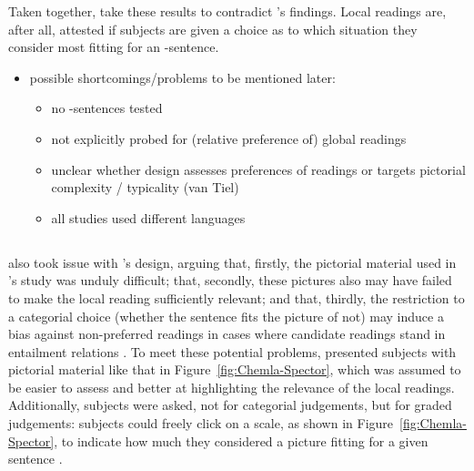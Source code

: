 \documentclass[fleqn,reqno,10pt,draft]{article}
\newcommand{\as}{\acro{as}}
\renewcommand{\es}{\acro{es}}
\begin{document}
Taken together, \citeauthor{CliftonDube2010:Embedded-Implic} take
these results to contradict
\citeauthor{GeurtsPouscoulous2009:Embedded-Implic}'s findings. Local
readings are, after all, attested if subjects are given a choice as to
which situation they consider most fitting for an \as-sentence.

\begin{itemize}
\item possible shortcomings/problems to be mentioned later:
  \begin{itemize}
  \item no \es-sentences tested
  \item not explicitly probed for (relative preference of) global
    readings
  \item unclear whether design assesses preferences of readings or
    targets pictorial complexity / typicality (van Tiel)
  \item all studies used different languages
  \end{itemize}
\end{itemize}


\subsection{\citet{ChemlaSpector2010:Experimental-Ev}}
\label{sec:Chemla-Spector}

\citet{ChemlaSpector2010:Experimental-Ev} also took issue with
\citeauthor{GeurtsPouscoulous2009:Embedded-Implic}'s design, arguing
that, firstly, the pictorial material used in
\citeauthor{GeurtsPouscoulous2009:Embedded-Implic}'s study was unduly
difficult; that, secondly, these pictures also may have failed to make
the local reading sufficiently relevant; and that, thirdly, the
restriction to a categorial choice (whether the sentence fits the
picture of not) may induce a bias against non-preferred readings in
cases where candidate readings stand in entailment relations
\citep[c.f.][for this latter
criticism]{Sauerland2010:Embedded-Implic}. To meet these potential
problems, \citet{ChemlaSpector2010:Experimental-Ev} presented subjects
with pictorial material like that in Figure~\ref{fig:Chemla-Spector},
which was assumed to be easier to assess and better at highlighting
the relevance of the local readings. Additionally, subjects were
asked, not for categorial judgements, but for graded judgements:
subjects could freely click on a scale, as shown in
Figure~\ref{fig:Chemla-Spector}, to indicate how much they considered
a picture fitting for a given sentence \citep[c.f.][for more on this
method]{Chemla2009:Presuppositions}.
\end{document}
